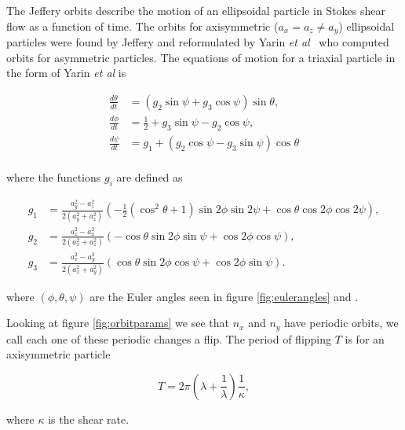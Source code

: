 \label{sec:jeffery}
The Jeffery orbits describe the motion of an ellipsoidal particle in Stokes shear flow as a function of time. The  orbits for axisymmetric ($a_x = a_z \ne a_y$) ellipsoidal particles were found by Jeffery and reformulated by Yarin \emph{et al}~\cite{Yarin} who computed orbits for asymmetric particles. The equations of motion for a triaxial particle in the form of Yarin \emph{et al} is

\begin{subequations}\label{eq:jeffrey}
\begin{align}
\frac{d\theta}{dt} 	&= (g_2 \sin \psi + g_3 \cos \psi ) \sin \theta, \\
\frac{d\phi}{dt} 	&= \tfrac{1}{2} + g_3\sin \psi - g_2 \cos \psi,\\
\frac{d\psi}{dt}	&= g_1 + (g_2\cos \psi - g_3\sin \psi) \cos \theta \\
\end{align}
\end{subequations}

where the functions  $g_i$ are defined as

\begin{subequations}
\begin{align}
g_1 &= \frac{a_y^2 - a_z^2}{2(a_y^2 + a_z^2)} 
		\left(-\tfrac{1}{2}(\cos^2 \theta + 1 )\sin 2\phi \sin 2\psi + \cos\theta \cos 2\phi \cos 2\psi \right), \\
g_2 &= \frac{a_z^2 - a_x^2}{2(a_x^2 + a_z^2)}
		\left( -\cos\theta \sin 2\phi \sin\psi  +  \cos 2\phi \cos\psi \right), \\
g_3 &= \frac{a_x^2 - a_y^2}{2(a_x^2 + a_y^2)}
		\left( \cos\theta \sin 2\phi \cos\psi + \cos 2\phi \sin\psi \right).
\end{align}
\end{subequations}

where $(\phi, \theta, \psi)$ are the Euler angles seen in figure \ref{fig:eulerangles} and . 

Looking at figure \ref{fig:orbitparams} we see that $n_x$ and $n_y$ have periodic orbits, we call each one of these periodic changes a flip. The period of flipping $T$ is for an axisymmetric particle \cite{Jeffery}

\begin{equation}\label{eq:flipRate}
T = 2\pi \left( \lambda + \frac{1}{\lambda} \right)\frac{1}{\kappa},
\end{equation}

\noindent where $\kappa$ is the shear rate. 


